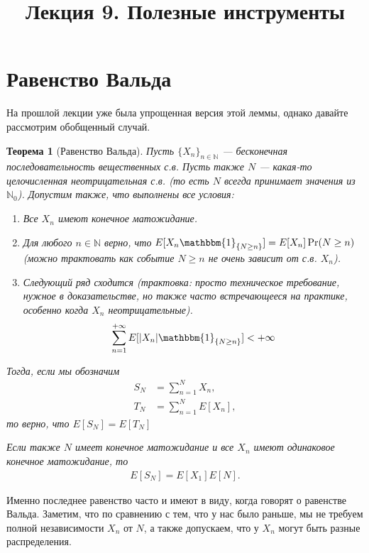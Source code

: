 \documentclass[12pt]{article}
\title{Лекция 9. Полезные инструменты}
\newcommand\N{\mathbb{N}}
\newcommand\one{\mathbbm{1}}
\newtheorem{theorem}{Теорема}
\begin{document}
\maketitle


\section{Равенство Вальда}

На прошлой лекции уже была упрощенная версия этой леммы, однако давайте рассмотрим обобщенный случай.

\begin{theorem}[Равенство Вальда]
  Пусть $\{X_n\}_{n \in \N}$ --- бесконечная последовательность вещественных с.в. Пусть также $N$ --- какая-то целочисленная неотрицательная с.в. (то есть $N$ всегда принимает значения из $\N_0$). Допустим также, что выполнены все условия:
  \begin{enumerate}
    \item Все $X_n$ имеют конечное матожидание.
    \item Для любого $n \in \N$ верно, что $E[X_n \one_{\{N \ge n\}}] = E[X_n] \Pr(N \ge n)$ (можно трактовать как событие $N \ge n$ не очень зависит от с.в. $X_n$).
    \item Следующий ряд сходится (трактовка: просто техническое требование, нужное в доказательстве, но также часто встречающееся на практике, особенно когда $X_n$ неотрицательные).
    \begin{align*}
      \sum_{n = 1}^{+\infty} E[|X_n|\one_{\{N \ge n\}}] < +\infty
    \end{align*}
  \end{enumerate}
  Тогда, если мы обозначим 
  \begin{align*}
    S_N &= \sum_{n = 1}^N X_n, \\
    T_N &= \sum_{n = 1}^N E[X_n],
  \end{align*}
  то верно, что $E[S_N] = E[T_N]$
  
  Если также $N$ имеет конечное матожидание и все $X_n$ имеют одинаковое конечное матожидание, то
  \begin{align*}
    E[S_N] = E[X_1] E[N].
  \end{align*}
\end{theorem}

Именно последнее равенство часто и имеют в виду, когда говорят о равенстве Вальда. Заметим, что по сравнению с тем, что у нас было раньше, мы не требуем полной независимости $X_n$ от $N$, а также допускаем, что у $X_n$ могут быть разные распределения.
\end{document}
